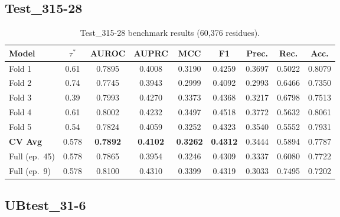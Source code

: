 \documentclass[11pt,a4paper]{article}
\begin{document}
\subsection{Test\_315-28}

\begin{table}[h]
\centering
\caption{Test\_315-28 benchmark results (60{,}376 residues).}
\label{tab:t315}
\setlength{\tabcolsep}{4.5pt}
\begin{tabular}{lcccccccc}
\toprule
\textbf{Model} & $\tau^*$ & \textbf{AUROC} & \textbf{AUPRC} & \textbf{MCC} & \textbf{F1} & \textbf{Prec.} & \textbf{Rec.} & \textbf{Acc.} \\
\midrule
Fold 1 & 0.61 & 0.7895 & 0.4008 & 0.3190 & 0.4259 & 0.3697 & 0.5022 & 0.8079 \\
Fold 2 & 0.74 & 0.7745 & 0.3943 & 0.2999 & 0.4092 & 0.2993 & 0.6466 & 0.7350 \\
Fold 3 & 0.39 & 0.7993 & 0.4270 & 0.3373 & 0.4368 & 0.3217 & 0.6798 & 0.7513 \\
Fold 4 & 0.61 & 0.8002 & 0.4232 & 0.3497 & 0.4518 & 0.3772 & 0.5632 & 0.8061 \\
Fold 5 & 0.54 & 0.7824 & 0.4059 & 0.3252 & 0.4323 & 0.3540 & 0.5552 & 0.7931 \\
\midrule
\textbf{CV Avg} & 0.578 & \textbf{0.7892} & \textbf{0.4102} & \textbf{0.3262} & \textbf{0.4312} & 0.3444 & 0.5894 & 0.7787 \\
\midrule
Full (ep.~45) & 0.578 & 0.7865 & 0.3954 & 0.3246 & 0.4309 & 0.3337 & 0.6080 & 0.7722 \\
Full (ep.~9)  & 0.578 & 0.8100 & 0.4310 & 0.3399 & 0.4319 & 0.3033 & 0.7495 & 0.7202 \\
\bottomrule
\end{tabular}
\end{table}

\subsection{UBtest\_31-6}
\end{document}
